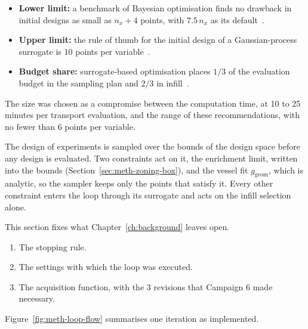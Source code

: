 \begin{itemize}
  \item \textbf{Lower limit:} a benchmark of Bayesian optimisation finds
        no drawback in initial designs as small as $n_x + 4$ points, with
        $7.5\,n_x$ as its default~\cite{leriche_picheny_2021}.
  \item \textbf{Upper limit:} the rule of thumb for the initial design of a
        Gaussian-process surrogate is 10 points per
        variable~\cite{whyte_2020}.
  \item \textbf{Budget share:} surrogate-based optimisation places $1/3$
        of the evaluation budget in the sampling plan and $2/3$ in
        infill~\cite{forrester_book_2008}.
\end{itemize}

The size was chosen as a compromise between the computation time, at 10
to 25 minutes per transport evaluation, and the range of these
recommendations, with no fewer than 6 points per variable.

The design of experiments is sampled over the bounds of the design
space before any design is evaluated. Two constraints act on it, the
enrichment limit, written into the bounds
(Section~\ref{sec:meth-zoning-box}), and the vessel fit
$g_\mathrm{geom}$, which is analytic, so the sampler keeps only the
points that satisfy it. Every other constraint enters the loop through
its surrogate and acts on the infill selection alone.

This section fixes what Chapter~\ref{ch:background} leaves open.

\begin{enumerate}
  \item The stopping rule.

  \item The settings with which the loop was executed.

  \item The acquisition function, with the 3 revisions that
        Campaign 6 made necessary.
\end{enumerate}

Figure~\ref{fig:meth-loop-flow} summarises one iteration as
implemented.

